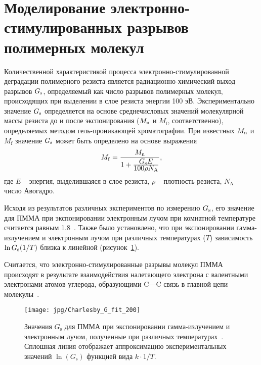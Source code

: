 \section{Моделирование электронно-стимулированных разрывов полимерных молекул} \label{sec:G_value}
Количественной характеристикой процесса электронно-стимулированной деградации полимерного резиста является радиационно-химический выход разрывов $G_\mathrm{s}$, определяемый как число разрывов полимерных молекул, происходящих при выделении в слое резиста энергии 100 эВ. Экспериментально значение $G_\mathrm{s}$ определяется на основе среднечисловых значений молекулярной массы резиста до и после экспонирования ($M_\mathrm{n}$ и $M_\mathrm{f}$, соответственно), определяемых методом гель-проникающей хроматографии. При известных $M_\mathrm{n}$ и $M_\mathrm{f}$ значение $G_\mathrm{s}$ может быть определено на основе выражения~\cite{Greeneich1979_Mf_Mn}
\begin{equation} \label{eq:G_value_Mn_Mf}
	M_\mathrm{f} = \frac{\displaystyle M_\mathrm{n}}{1 + \frac{\displaystyle G_\mathrm{s} E}{\displaystyle 100 \rho N_\mathrm{A}}},
\end{equation}
где $E$ -- энергия, выделившаяся в слое резиста, $\rho$ -- плотность резиста, $N_\mathrm{A}$ -- число Авогадро.

Исходя из результатов различных экспериментов по измерению $G_\mathrm{s}$, его значение для ПММА при экспонировании электронным лучом при комнатной температуре считается равным 1.8~\cite{Charlesby_1964_Gs}. Также было установлено, что при экспонировании гамма-излучением и электронным лучом при различных температурах ($T$) зависимость $\ln G_\mathrm{s} (1/T)$ близка к линейной (рисунок~\ref{fig:Gs_Charlesby}).

Считается, что электронно-стимулированные разрывы молекул ПММА происходят в результате взаимодействия налетающего электрона с валентными электронами атомов углерода, образующими C---C связь в главной цепи молекулы~\cite{Stepanova_2006}.

\begin{figure}[h]
	\begin{center}
		\texttt{[image: jpg/Charlesby\_G\_fit\_200]}
		\caption{Значения $G_\mathrm{s}$ для ПММА при экспонировании гамма-излучением и электронным лучом, полученные при различных температурах~\cite{Charlesby_1964_Gs}. Сплошная линия отображает аппроксимацию экспериментальных значений $\ln(G_\mathrm{s})$ функцией вида $k\cdot1/T$.}
		\label{fig:Gs_Charlesby}
	\end{center}
\end{figure}
